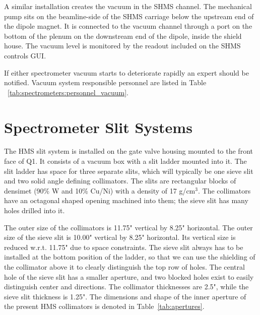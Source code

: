 {A similar installation creates the vacuum in the SHMS channel. The mechanical
pump sits on the beamline-side of the SHMS carriage below the
upstream end of the dipole magnet. It is connected to the vacuum channel
through a port on the bottom of the plenum on the downstream end of the
dipole, inside the shield house. The vacuum level is monitored by the
readout included on the SHMS controls GUI.

If either spectrometer vacuum starts to deteriorate rapidly an expert should be notified.
Vacuum system responsible personnel are listed in Table ~\ref{tab:spectrometers:personnel_vacuum}.



\section{Spectrometer Slit Systems}
\label{sec:hms_slit}

The HMS slit system is installed on the gate valve housing mounted to the
front face of Q1. It consists of a vacuum box with a slit ladder
mounted into it. The slit ladder has space for three separate slits,
which will typically be one sieve slit and two solid angle defining collimators.
The slits are rectangular blocks of densimet (90\% W and 10\% Cu/Ni)
with a density of 17 g/cm$^3$. The collimators have an octagonal shaped
opening machined into them; the sieve slit has many holes drilled
into it.

The outer size of the collimators is 11.75" vertical by 8.25"
horizontal. The outer size of the sieve slit is 10.00" vertical
by 8.25" horizontal.
Its vertical size is reduced w.r.t. 11.75" due to space constraints.
The sieve slit always has to be installed at the bottom position of the ladder,
so that we can use the shielding of the collimator above it to
clearly distinguish the top row of holes. The central hole
of the sieve slit has a smaller aperture, and two blocked holes
exist to easily distinguish center and directions.
The collimator thicknesses are 2.5", while the sieve slit thickness
is 1.25". The dimensions and shape of the inner aperture of the present
HMS collimators is denoted in Table~\ref{tab:apertures}.

}
